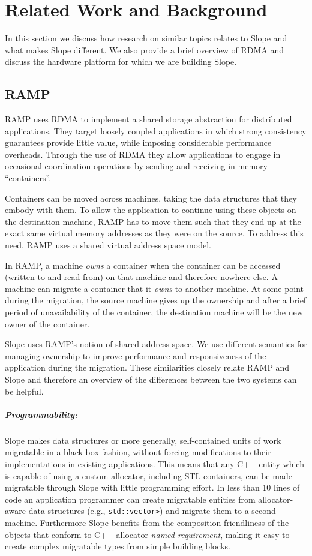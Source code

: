 \chapter{Related Work and Background}
\label{chap:related}
In this section we discuss how research on similar topics relates to
Slope and what makes Slope different. We also provide a brief overview of
RDMA and discuss the hardware platform for which we are building Slope.

\section{RAMP}
RAMP\cite{memon2018ramp} uses RDMA to implement a shared storage abstraction
for distributed applications. They target loosely coupled applications in which
strong consistency guarantees provide little value, while imposing considerable
performance overheads. Through the use of RDMA they allow applications to engage in
occasional coordination operations by sending and receiving in-memory
``containers''.

Containers can be moved across machines, taking the data structures
that they embody with them. To allow the application to continue using these
objects on the destination machine, RAMP has to move them such that they
end up at the exact same
virtual memory addresses as they were on the source. To address this need,
RAMP uses a shared virtual address space model.

In RAMP, a machine \emph{owns} a container when the container can be accessed
(written to and read from)
on that machine and therefore nowhere else. A machine can migrate a container
that it \emph{owns} to another machine. At some point during the migration, the
source machine gives up the ownership and after a brief period of unavailability
of the container, the destination machine will be the new owner of the container.

Slope uses RAMP's notion of shared address space. We use different semantics
for managing ownership to improve performance and responsiveness of the application
during the migration. These similarities closely relate
RAMP and Slope and therefore an overview of the differences between the two
systems can be helpful.

\paragraph{Programmability:}

Slope makes data structures or more generally, self-contained units of
work migratable in a black box fashion, without forcing modifications to
their implementations in existing applications.
This means that any C++ entity which is capable of using a custom
allocator, including STL containers, can be made migratable through Slope
with little programming effort. In less than 10 lines of code an application
programmer can create
migratable entities from
allocator-aware data structures (e.g., \texttt{std::vector>}) and migrate them to
a second machine. Furthermore Slope benefits
from the composition friendliness of the objects that conform to C++ 
allocator \emph{named requirement}\cite{cppnamedreqalloc}, making it easy to create complex migratable
types from simple building blocks.

